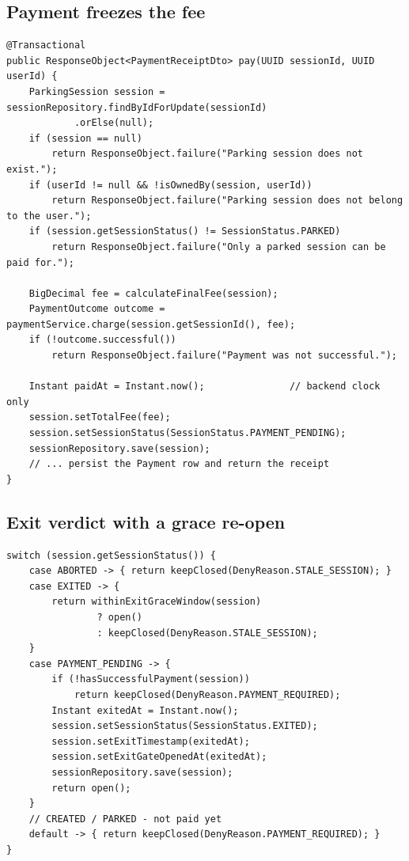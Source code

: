 \subsection{Payment freezes the fee}

\begin{lstlisting}[style=java,caption={The session row is locked, the fee is frozen
and the receipt records the backend's payment time.},label={lst:pay}]
@Transactional
public ResponseObject<PaymentReceiptDto> pay(UUID sessionId, UUID userId) {
    ParkingSession session = sessionRepository.findByIdForUpdate(sessionId)
            .orElse(null);
    if (session == null)
        return ResponseObject.failure("Parking session does not exist.");
    if (userId != null && !isOwnedBy(session, userId))
        return ResponseObject.failure("Parking session does not belong to the user.");
    if (session.getSessionStatus() != SessionStatus.PARKED)
        return ResponseObject.failure("Only a parked session can be paid for.");

    BigDecimal fee = calculateFinalFee(session);
    PaymentOutcome outcome = paymentService.charge(session.getSessionId(), fee);
    if (!outcome.successful())
        return ResponseObject.failure("Payment was not successful.");

    Instant paidAt = Instant.now();               // backend clock only
    session.setTotalFee(fee);
    session.setSessionStatus(SessionStatus.PAYMENT_PENDING);
    sessionRepository.save(session);
    // ... persist the Payment row and return the receipt
}
\end{lstlisting}

\subsection{Exit verdict with a grace re-open}

\begin{lstlisting}[style=java,caption={Exit is decided from state and payment; the
grace window is measured from the gate opening.},label={lst:exit}]
switch (session.getSessionStatus()) {
    case ABORTED -> { return keepClosed(DenyReason.STALE_SESSION); }
    case EXITED -> {
        return withinExitGraceWindow(session)
                ? open()
                : keepClosed(DenyReason.STALE_SESSION);
    }
    case PAYMENT_PENDING -> {
        if (!hasSuccessfulPayment(session))
            return keepClosed(DenyReason.PAYMENT_REQUIRED);
        Instant exitedAt = Instant.now();
        session.setSessionStatus(SessionStatus.EXITED);
        session.setExitTimestamp(exitedAt);
        session.setExitGateOpenedAt(exitedAt);
        sessionRepository.save(session);
        return open();
    }
    // CREATED / PARKED - not paid yet
    default -> { return keepClosed(DenyReason.PAYMENT_REQUIRED); }
}
\end{lstlisting}


